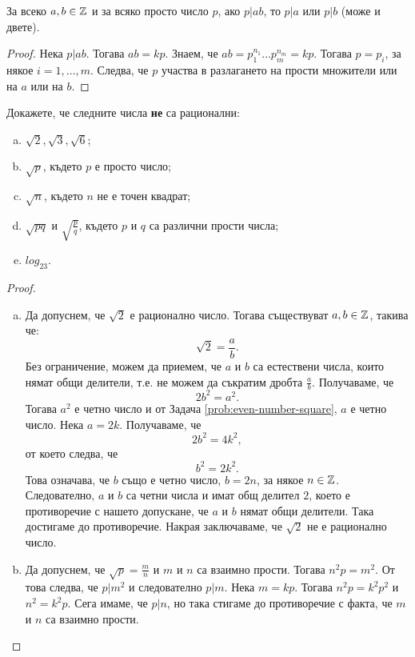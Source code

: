 \begin{problem}
  За всеко $a,b \in \mathbb{Z}$ и за всяко просто число $p$,
  ако $p\vert ab$, то $p\vert a$ или $p\vert b$ (може и двете).
\end{problem}
\begin{proof}
  Нека $p \vert ab$. Тогава $ab = kp$.
  Знаем, че $ab = p^{n_1}_1\dots p^{n_m}_m = kp$.
  Тогава $p = p_i$, за някое $i = 1,\dots,m$.
  Следва, че $p$ участва в разлагането на прости множители или на $a$ или на $b$.
\end{proof}

\begin{problem}
  Докажете, че следните числа {\bf не} са рационални:
  \begin{enumerate}[a)]
  \item
    $\sqrt{2},\sqrt{3},\sqrt{6}$;
  \item
    $\sqrt{p}$, където $p$ е просто число;
  \item
    $\sqrt{n}$, където $n$ не е точен квадрат;
  \item
    $\sqrt{pq}$ и $\sqrt{\frac{p}{q}}$, където $p$ и $q$ са различни прости числа;
  \item
    $log_23$.
  \end{enumerate}
\end{problem}
\begin{proof}
  \begin{enumerate}[a)]
  \item
    Да допуснем, че $\sqrt{2}$ е рационално число. Тогава  съществуват $a,b \in \mathbb{Z}$, такива че:
    \[\sqrt{2} = \frac{a}{b}.\]
    Без ограничение, можем да приемем, че $a$ и $b$ са естествени числа,
    които нямат общи делители, т.е. не можем да съкратим дробта $\frac{a}{b}$.
    Получаваме, че \[2b^2 = a^2.\]
    Тогава $a^2$ е четно число и от Задача \ref{prob:even-number-square}, $a$ е четно число.
    Нека $a = 2k$. Получаваме, че
    \[2b^2 = 4k^2,\]
    от което следва, че
    \[b^2 = 2k^2.\]
    Това означава, че $b$ също е четно число, $b = 2n$, за някое $n \in \mathbb{Z}$.
    Следователно, $a$ и $b$ са четни числа и имат общ делител $2$,
    което е противоречие с нашето допускане, че $a$ и $b$ нямат общи делители.
    Така достигаме до противоречие.
    Накрая заключаваме, че $\sqrt{2}$ не е рационално число.
  \item
    Да допуснем, че $\sqrt{p} = \frac{m}{n}$ и $m$ и $n$ са взаимно прости.
    Тогава $n^2p = m^2$. От това следва, че $p | m^2$ и следователно $p | m$.
    Нека $m = kp$. Тогава $n^2p = k^2p^2$ и $n^2 = k^2p$.
    Сега имаме, че $p | n$, но така стигаме до противоречие с факта, че $m$ и $n$
    са взаимно прости.
  \end{enumerate}
\end{proof}

